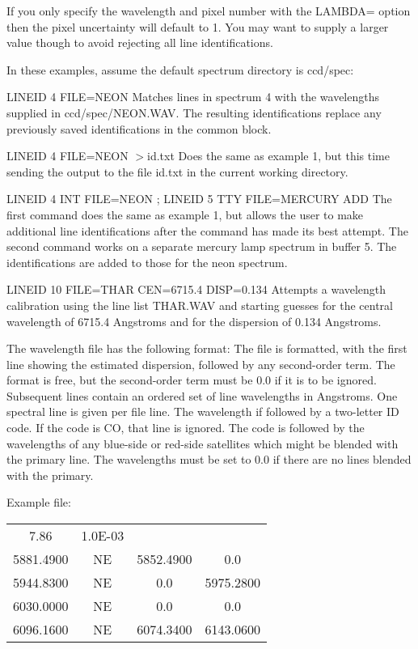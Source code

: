 If you only specify the wavelength and pixel number with the LAMBDA= option
then the pixel uncertainty will default to 1.  You may want to supply a
larger value though to avoid rejecting all line identifications.

In these examples, assume the default spectrum directory is 
ccd/spec:
\begin{example}
  \item[LINEID 4 FILE=NEON\hfill]{Matches lines in spectrum 4 with the
       wavelengths supplied in ccd/spec/NEON.WAV.  The resulting
       identifications replace any previously saved identifications in the
       common block.}

  \item[LINEID 4 FILE=NEON $>$id.txt\hfill]{Does the same as example 1, but
       this time sending the output to the file id.txt in the current
       working directory.}

  \item[LINEID 4 INT FILE=NEON ; LINEID 5 TTY FILE=MERCURY ADD\hfill]{The
       first command does the same as example 1, but allows the user to
       make additional line identifications after the command has made its
       best attempt.  The second command works on a separate mercury lamp
       spectrum in buffer 5.  The identifications are added to those for
       the neon spectrum.}

  \item[LINEID 10 FILE=THAR CEN=6715.4 DISP=0.134\hfill]{Attempts a
       wavelength calibration using the line list THAR.WAV and starting
       guesses for the central wavelength of 6715.4 Angstroms and for the
       dispersion of 0.134 Angstroms.}
\end{example}

The wavelength file has the following format: The file is formatted, with
the first line showing the estimated dispersion, followed by any
second-order term. The format is free, but the second-order term must be
0.0 if it is to be ignored.  Subsequent lines contain an ordered set of
line wavelengths in Angstroms.  One spectral line is given per file
line. The wavelength if followed by a two-letter ID code.  If the code is
CO, that line is ignored.  The code is followed by the wavelengths of any
blue-side or red-side satellites which might be blended with the primary
line.  The wavelengths must be set to 0.0 if there are no lines blended
with the primary.

Example file:
\begin{tabular}{cccc}
  7.86&1.0E-03&&\\
5881.4900 &NE& 5852.4900 &   0.0\\
5944.8300 &NE&    0.0    &5975.2800\\
6030.0000 &NE&    0.0    &   0.0\\
6096.1600 &NE& 6074.3400 &6143.0600\\
\end{tabular}

